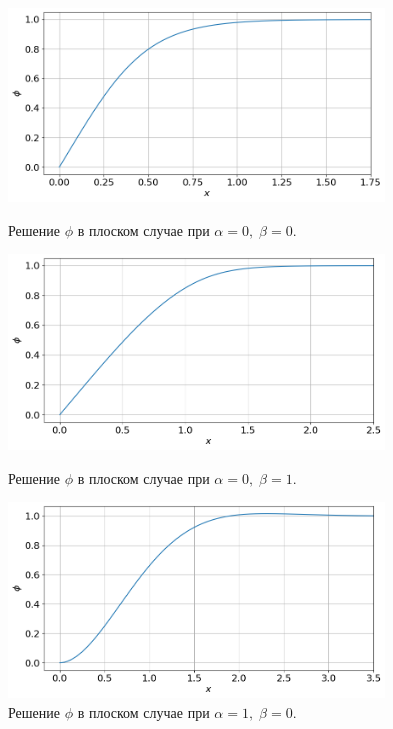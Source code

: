 \begin{figure}[!tp]
	\centering
	\includegraphics[width=0.89\textwidth]{figures/result_volumes.png}
	\vspace{-0.3cm}
	\caption{Решение $\phi$ в плоском случае при $\alpha = 0, \; \beta = 0$.}
	\label{fig:result_volumes}
	\vspace{0.5cm}

	\includegraphics[width=0.89\textwidth]{figures/result_volumes_p.png}
	\vspace{-0.3cm}
	\caption{Решение $\phi$ в плоском случае при $\alpha = 0, \; \beta = 1$.}
	\label{fig:result_volumes_p}
	\vspace{0.5cm}
	
	\includegraphics[width=0.89\textwidth]{figures/result_volumes_bi.png}
	\vspace{-0.3cm}
	\caption{Решение $\phi$ в плоском случае при $\alpha = 1, \; \beta = 0$.}
	\label{fig:result_volumes_bi}
\end{figure}

